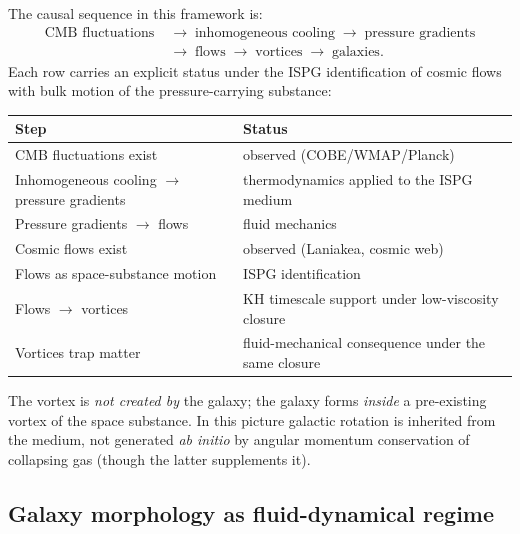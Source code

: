 \documentclass[11pt]{article}
\begin{document}
The causal sequence in this framework is:
\begin{equation}
  \boxed{
  \begin{aligned}
  \text{CMB fluctuations}
  &\;\to\; \text{inhomogeneous cooling}
  \;\to\; \text{pressure gradients}\\
  &\;\to\; \text{flows}
  \;\to\; \text{vortices}
  \;\to\; \text{galaxies}.
  \end{aligned}
  }
  \label{eq:vortex_chain}
\end{equation}
Each row carries an explicit status under the ISPG identification of
cosmic flows with bulk motion of the pressure-carrying substance:
\begin{center}
\begin{tabular}{@{}ll@{}}
\toprule
\textbf{Step} & \textbf{Status} \\
\midrule
CMB fluctuations exist & observed (COBE/WMAP/Planck) \\
Inhomogeneous cooling $\to$ pressure gradients & thermodynamics applied to the ISPG medium \\
Pressure gradients $\to$ flows & fluid mechanics \\
Cosmic flows exist & observed (Laniakea, cosmic web) \\
Flows as space-substance motion & ISPG identification \\
Flows $\to$ vortices & KH timescale support under low-viscosity closure \\
Vortices trap matter & fluid-mechanical consequence under the same closure \\
\bottomrule
\end{tabular}
\end{center}

The vortex is \emph{not created by} the galaxy; the galaxy forms
\emph{inside} a pre-existing vortex of the space substance.  In
this picture galactic rotation is inherited from the medium, not
generated \textit{ab initio} by angular momentum conservation of
collapsing gas (though the latter supplements it).

\subsection{Galaxy morphology as fluid-dynamical regime}\label{sec:morphology}
\end{document}
